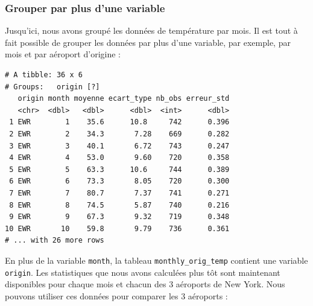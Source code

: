 \documentclass[a4paperpaper,]{article}
\newenvironment{Shaded}{\begin{snugshade}}{\end{snugshade}}
\newcommand{\KeywordTok}[1]{\textcolor[rgb]{0.13,0.29,0.53}{\textbf{#1}}}
\newcommand{\DataTypeTok}[1]{\textcolor[rgb]{0.13,0.29,0.53}{#1}}
\newcommand{\StringTok}[1]{\textcolor[rgb]{0.31,0.60,0.02}{#1}}
\newcommand{\OtherTok}[1]{\textcolor[rgb]{0.56,0.35,0.01}{#1}}
\newcommand{\OperatorTok}[1]{\textcolor[rgb]{0.81,0.36,0.00}{\textbf{#1}}}
\newcommand{\NormalTok}[1]{#1}
\theoremstyle{definition}
\theoremstyle{definition}
\theoremstyle{definition}
\theoremstyle{remark}
\begin{document}
\subsubsection{Grouper par plus d'une
variable}\label{grouper-par-plus-dune-variable}

Jusqu'ici, nous avons groupé les données de température par mois. Il est
tout à fait possible de grouper les données par plus d'une variable, par
exemple, par mois et par aéroport d'origine :

\begin{Shaded}
\end{Shaded}

\begin{verbatim}
# A tibble: 36 x 6
# Groups:   origin [?]
   origin month moyenne ecart_type nb_obs erreur_std
   <chr>  <dbl>   <dbl>      <dbl>  <int>      <dbl>
 1 EWR        1    35.6      10.8     742      0.396
 2 EWR        2    34.3       7.28    669      0.282
 3 EWR        3    40.1       6.72    743      0.247
 4 EWR        4    53.0       9.60    720      0.358
 5 EWR        5    63.3      10.6     744      0.389
 6 EWR        6    73.3       8.05    720      0.300
 7 EWR        7    80.7       7.37    741      0.271
 8 EWR        8    74.5       5.87    740      0.216
 9 EWR        9    67.3       9.32    719      0.348
10 EWR       10    59.8       9.79    736      0.361
# ... with 26 more rows
\end{verbatim}

En plus de la variable \texttt{month}, la tableau
\texttt{monthly\_orig\_temp} contient une variable \texttt{origin}. Les
statistiques que nous avons calculées plus tôt sont maintenant
disponibles pour chaque mois et chacun des 3 aéroports de New York. Nous
pouvons utiliser ces données pour comparer les 3 aéroports :
\end{document}
